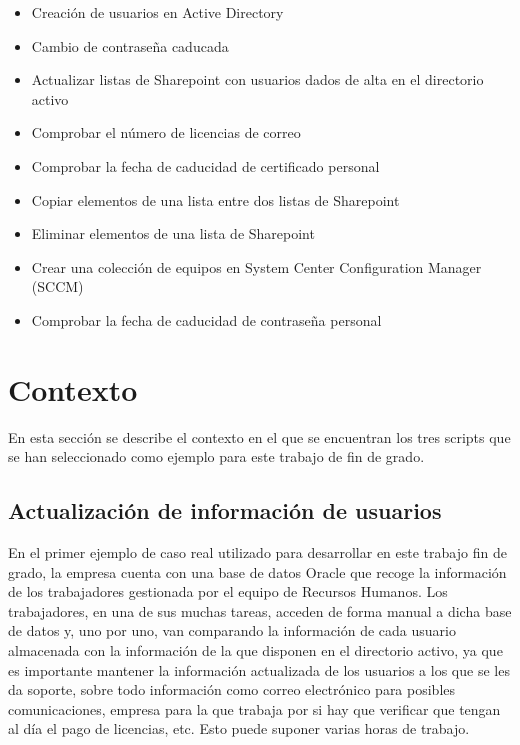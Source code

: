 \documentclass[a4paper, 12pt]{book}
\begin{document}
\begin{itemize}
\item Creación de usuarios en Active Directory

\item Cambio de contraseña caducada

\item Actualizar listas de Sharepoint con usuarios dados de alta en el directorio activo

\item Comprobar el número de licencias de correo

\item Comprobar la fecha de caducidad de certificado personal

\item Copiar elementos de una lista entre dos listas de Sharepoint

\item Eliminar elementos de una lista de Sharepoint

\item Crear una colección de equipos en System Center Configuration Manager (SCCM)

\item Comprobar la fecha de caducidad de contraseña personal
\end{itemize}


\section{Contexto}
\label{sec:contexto}

En esta sección se describe el contexto en el que se encuentran los tres scripts que se han seleccionado como ejemplo para este trabajo de fin de grado.

\subsection{Actualización de información de usuarios}
\label{subsec:Actualización de información de usuarios}

En el primer ejemplo de caso real utilizado para desarrollar en este trabajo fin de grado, la empresa cuenta con una base de datos Oracle que recoge la información de los trabajadores gestionada por el equipo de Recursos Humanos. Los trabajadores, en una de sus muchas tareas, acceden de forma manual a dicha base de datos y, uno por uno, van comparando la información de cada usuario almacenada con la información de la que disponen en el directorio activo, ya que es importante mantener la información actualizada de los usuarios a los que se les da soporte, sobre todo información como correo electrónico para posibles comunicaciones, empresa para la que trabaja por si hay que verificar que tengan al día el pago de licencias, etc. Esto puede suponer varias horas de trabajo.
\end{document}
